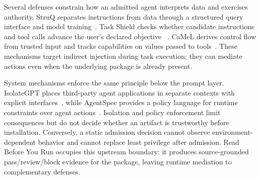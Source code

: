 Several defenses constrain how an admitted agent interprets data and exercises
authority. StruQ separates instructions from data through a structured query
interface and model training~\cite{chen2025struq}. Task Shield checks whether
candidate instructions and tool calls advance the user's declared objective
~\cite{jia2025taskshield}. CaMeL derives control flow from trusted input and
tracks capabilities on values passed to tools~\cite{debenedetti2026camel}.
These mechanisms target indirect injection during task execution; they can
mediate actions even when the underlying package is already present.

System mechanisms enforce the same principle below the prompt layer.
IsolateGPT places third-party agent applications in separate contexts with
explicit interfaces~\cite{wu2025isolategpt}, while AgentSpec provides a policy
language for runtime constraints over agent actions~\cite{wang2026agentspec}.
Isolation and policy enforcement limit consequences but do not decide whether
an artifact is trustworthy before installation. Conversely, a static
admission decision cannot observe environment-dependent behavior and cannot
replace least privilege after admission. Read Before You Run occupies this
upstream boundary: it produces source-grounded pass/review/block evidence for
the package, leaving runtime mediation to complementary defenses.
